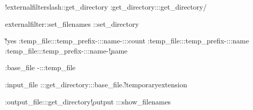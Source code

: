         {\showmessage\m!externalfilter{slash}\externalfilter::get_directory
         \edef\externalfilter::get_directory{\externalfilter::get_directory/}}
\stoptexdefinition
  



\starttexdefinition externalfilter::set_filenames
   \externalfilter::set_directory

   \v!yes
        {\edef\externalfilter::temp_file{\externalfilter::temp_prefix-\externalfilter::name-\csname\externalfilter::count\endcsname}}
        {\edef\externalfilter::temp_file{\externalfilter::temp_prefix-\externalfilter::name}}
        {\edef\externalfilter::temp_file{\externalfilter::temp_prefix-\externalfilter::name-\externalfilterparameter\c!name}}

   \edef\externalfilter::base_file  {\jobname-\externalfilter::temp_file}

        {\edef\bufferprefix{\externalfilter::get_directory\jobname-}}

   \edef\externalfilter::input_file {\externalfilter::get_directory\externalfilter::base_file.\f!temporaryextension}

   \edef\externalfilter::output_file{\externalfilter::get_directory\externalfilterparameter\c!output}
   \iftraceexternalfilters \externalfilter::show_filenames \fi
\stoptexdefinition



